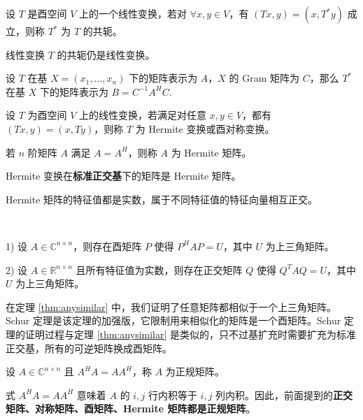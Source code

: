 \begin{definition}[复线性变换的共轭]
设 $T$ 是酉空间 $V$ 上的一个线性变换，若对 $\forall x,y\in V$，有 $(Tx,y)=(x,T^\ast y)$ 成立，则称 $T^\ast$ 为 $T$ 的共轭。
\end{definition}

\begin{property}
线性变换 $T$ 的共轭仍是线性变换。
\end{property}
\begin{theorem}
设 $T$ 在基 $X=(x_1,\ldots,x_n)$ 下的矩阵表示为 $A$，$X$ 的 Gram 矩阵为 $C$，那么 $T^\ast$ 在基 $X$ 下的矩阵表示为 $B=C^{-1}A^HC$.
\end{theorem}

\begin{definition}
设 $T$ 为酉空间 $V$ 上的线性变换，若满足对任意 $x,y\in V$，都有 $(Tx,y)=(x,Ty)$，则称 $T$ 为 Hermite 变换或酉对称变换。
\end{definition}

\begin{definition}[Hermite 矩阵]
若 $n$ 阶矩阵 $A$ 满足 $A=A^H$，则称 $A$ 为 Hermite 矩阵。
\end{definition}

\begin{theorem}
Hermite 变换在\textbf{标准正交基}下的矩阵是 Hermite 矩阵。
\end{theorem}

\begin{theorem}
Hermite 矩阵的特征值都是实数，属于不同特征值的特征向量相互正交。
\end{theorem}

\begin{theorem}[Schur 定理]
\label{thm:schur}
\ 

1) 设 $A\in\mathbb C^{n\times n}$，则存在酉矩阵 $P$ 使得 $P^HAP=U$，其中 $U$ 为上三角矩阵。

2) 设 $A\in\mathbb R^{n\times n}$ 且所有特征值为实数，则存在正交矩阵 $Q$ 使得 $Q^TAQ=U$，其中 $U$ 为上三角矩阵。
\end{theorem}

\begin{remark}
在定理 \ref{thm:anysimilar} 中，我们证明了任意矩阵都相似于一个上三角矩阵。Schur 定理是该定理的加强版，它限制用来相似化的矩阵是一个酉矩阵。Schur 定理的证明过程与定理 \ref{thm:anysimilar} 是类似的，只不过基扩充时需要扩充为标准正交基，所有的可逆矩阵换成酉矩阵。
\end{remark}

\begin{definition}[正规矩阵]
设 $A\in\mathbb C^{n\times n}$ 且 $A^HA=AA^H$，称 $A$ 为正规矩阵。
\end{definition}
\begin{remark}
式 $A^HA=AA^H$ 意味着 $A$ 的 $i,j$ 行内积等于 $i,j$ 列内积。因此，前面提到的\textbf{正交矩阵、对称矩阵、酉矩阵、Hermite 矩阵都是正规矩阵}。
\end{remark}


